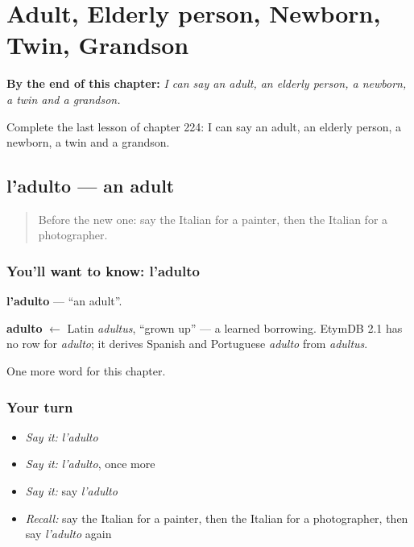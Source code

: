 
\chapter{Adult, Elderly person, Newborn, Twin, Grandson}
\label{ch:it-adult-elderly-person-newborn-twin-grandson}

\begin{chapteropening}
\textbf{By the end of this chapter:} \emph{I can say an adult, an elderly person, a newborn, a twin and a grandson.}

Complete the last lesson of chapter 224: I can say an adult, an elderly person, a newborn, a twin and a grandson.
\end{chapteropening}

\section[l'adulto]{l'adulto — an adult}

\label{lesson:IT-C224-adulto}



\begin{quote}
Before the new one: say the Italian for a painter, then the Italian for a photographer.
\end{quote}

\subsection*{You'll want to know: l'adulto}
\textbf{l'adulto} — \textquotedblleft{}an adult\textquotedblright{}.

\begin{cousinweb}
\textbf{adulto} $\leftarrow$ Latin \emph{adultus}, \textquotedblleft{}grown up\textquotedblright{} — a learned borrowing. EtymDB 2.1 has no row for \emph{adulto}; it derives Spanish and Portuguese \emph{adulto} from \emph{adultus}.
\end{cousinweb}

\begin{grammarlens}[title={What you've built}]
One more word for this chapter.
\end{grammarlens}

\subsection*{Your turn}
\begin{itemize}
\raggedright
  \item \emph{Say it:} \emph{l'adulto}
  \item \emph{Say it:} \emph{l'adulto}, once more
  \item \emph{Say it:} say \emph{l'adulto}
  \item \emph{Recall:} say the Italian for a painter, then the Italian for a photographer, then say \emph{l'adulto} again
\end{itemize}

